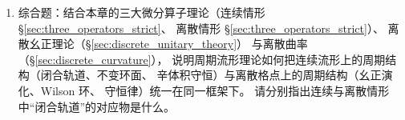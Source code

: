 \begin{enumerate}[leftmargin=3em, label=\textbf{题 \arabic*}]
    \item 综合题：结合本章的三大微分算子理论（连续情形 \S{}\ref{sec:three_operators_strict}、
    离散情形 \S{}\ref{sec:three_operators_strict}）、
    离散幺正理论（\S{}\ref{sec:discrete_unitary_theory}）
    与离散曲率（\S{}\ref{sec:discrete_curvature}），
    说明周期流形理论如何把连续流形上的周期结构（闭合轨道、不变环面、
    辛体积守恒）与离散格点上的周期结构（幺正演化、Wilson 环、
    守恒律）统一在同一框架下。
    请分别指出连续与离散情形中“闭合轨道”的对应物是什么。
\end{enumerate}

